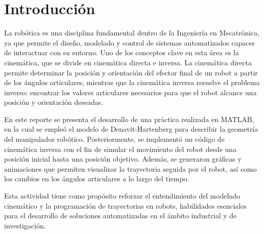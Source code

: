 \section{Introducción}
La robótica es una disciplina fundamental dentro de la Ingeniería en Mecatrónica, ya que permite el diseño, modelado y control de sistemas automatizados capaces de interactuar con su entorno. Uno de los conceptos clave en esta área es la cinemática, que se divide en cinemática directa e inversa. La cinemática directa permite determinar la posición y orientación del efector final de un robot a partir de los ángulos articulares, mientras que la cinemática inversa resuelve el problema inverso: encontrar los valores articulares necesarios para que el robot alcance una posición y orientación deseadas.

En este reporte se presenta el desarrollo de una práctica realizada en MATLAB, en la cual se empleó el modelo de Denavit-Hartenberg para describir la geometría del manipulador robótico. Posteriormente, se implementó un código de cinemática inversa con el fin de simular el movimiento del robot desde una posición inicial hasta una posición objetivo. Además, se generaron gráficas y animaciones que permiten visualizar la trayectoria seguida por el robot, así como los cambios en los ángulos articulares a lo largo del tiempo.

Esta actividad tiene como propósito reforzar el entendimiento del modelado cinemático y la programación de trayectorias en robots, habilidades esenciales para el desarrollo de soluciones automatizadas en el ámbito industrial y de investigación.